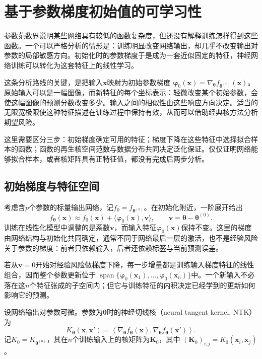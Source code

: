 \section{基于参数梯度初始值的可学习性}
\label{sec:neural-tangent-kernel}

参数范数界说明某些网络具有较低的函数复杂度，但还没有解释训练怎样得到这些函数。一个可以严格分析的情形是：训练明显改变网络输出，却几乎不改变输出对参数的局部敏感方向。初始化时的参数梯度于是成为一套近似固定的特征，神经网络训练可以转化为这套特征上的线性学习。

这条分析路线的关键，是把输入$\bm x$映射为初始参数梯度
$\bm\varphi_0(\bm x)=\nabla_{\bm\theta}f_{\bm\theta^{(0)}}(\bm x)$。
原始输入可以是一幅图像，而新特征的每个坐标表示：轻微改变某个初始参数，会使这幅图像的预测分数改变多少。输入之间的相似性由这些响应方向决定。适当的无限宽极限使这种特征描述在训练过程中保持有效，从而可以借助经典核方法分析期望风险。

这里需要区分三步：初始梯度确定可用的特征；梯度下降在这些特征中选择拟合样本的函数；函数的再生核空间范数与数据分布共同决定泛化保证。仅仅证明网络能够拟合样本，或者核矩阵具有正特征值，都没有完成后两步分析。

\subsection{初始梯度与特征空间}

考虑含$p$个参数的标量输出网络，记$f_0=f_{\bm\theta^{(0)}}$。在初始化附近，一阶展开给出
\begin{equation}
 f_{\bm\theta}(\bm x)\approx
 f_0(\bm x)+\langle\bm\varphi_0(\bm x),\bm v\rangle,
 \qquad \bm v=\bm\theta-\bm\theta^{(0)}.
 \label{eq:initial-gradient-feature-map}
\end{equation}
训练在线性化模型中调整的是系数$\bm v$，而输入特征$\bm\varphi_0(\bm x)$保持不变。这里的梯度由网络结构与初始化共同确定，通常不同于网络最后一层的激活，也不是经验风险关于参数的梯度：前者只依赖输入，后者还依赖标签与当前预测误差。

若从$\bm v=0$开始对经验风险做梯度下降，每一步增量都是训练输入梯度特征的线性组合，因而整个参数更新位于
$\operatorname{span}\{\bm\varphi_0(\bm x_1),\ldots,\bm\varphi_0(\bm x_n)\}$中。一个新输入不必落在这$n$个特征张成的子空间内；但它与训练特征的内积决定已经学到的更新如何影响它的预测。

\begin{definition}[神经切线核]
\label{def:neural-tangent-kernel}
设网络输出对参数可微。参数为$\bm\theta$时的神经切线核（neural tangent kernel, NTK）为
\[
 K_{\bm\theta}(\bm x,\bm x')=
 \left\langle\nabla_{\bm\theta}f_{\bm\theta}(\bm x),
               \nabla_{\bm\theta}f_{\bm\theta}(\bm x')\right\rangle.
\]
记$K_0=K_{\bm\theta^{(0)}}$，其在$n$个训练输入上的核矩阵为$\bm K_0$，其中
$(\bm K_0)_{i,j}=K_0(\bm x_i,\bm x_j)$。
\end{definition}

